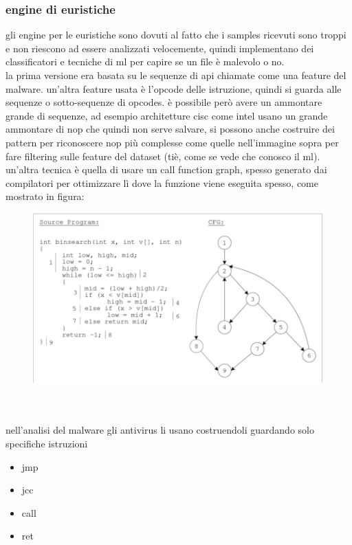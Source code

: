 \documentclass[12pt, oneside]{extbook} %
\begin{document}
\subsubsection{engine di euristiche}
gli engine per le euristiche sono dovuti al fatto che i samples ricevuti sono troppi e non riescono ad essere analizzati velocemente, quindi implementano dei classificatori e tecniche di ml per capire se un file è malevolo o no.\\la prima versione era basata su le sequenze di api chiamate come una feature del malware. un'altra feature usata è l'opcode delle istruzione, quindi si guarda alle sequenze o sotto-sequenze di opcodes. è possibile però avere un ammontare grande di sequenze, ad esempio architetture cisc come intel usano un grande ammontare di nop che quindi non serve salvare, si possono anche costruire dei pattern per riconoscere nop più complesse come quelle nell'immagine sopra per fare filtering sulle feature del dataset (tiè, come se vede che conosco il ml).\\un'altra tecnica è quella di usare un call function graph, spesso generato dai compilatori per ottimizzare lì dove la funzione viene eseguita spesso, come mostrato in figura:\\
\begin{figure}[!h]
	\includegraphics[scale=0.3]{immagini/flow_graph.png}
\end{figure}\\\\
nell'analisi del malware gli antivirus li usano costruendoli guardando solo specifiche istruzioni
\begin{itemize}
\item jmp
\item jcc
\item call
\item ret
\end{itemize}
\end{document}
